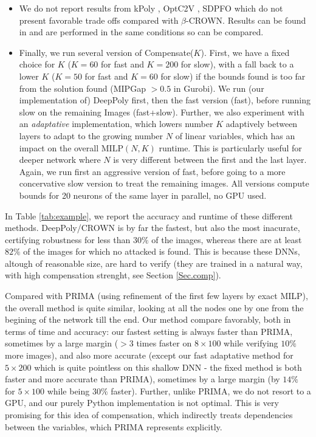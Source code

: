 \documentclass{llncs}
\newcommand{\MILP}{{\textrm{MILP}}}
\begin{document}
\begin{itemize}
	\item We do not report results from kPoly \cite{kpoly}, OptC2V \cite{optC2V}, 
	SDPFO \cite{SDPFI} which do not present favorable trade offs compared with $\beta$-CROWN. Results can be found in \cite{crown} and are performed in the same conditions so can be compared.
	\item Finally, we run several version of Compensate($K$). First, we have a fixed choice for $K$ ($K=60$ for fast and $K=200$ for slow), with a fall back to a lower $K$ ($K=50$ for fast and $K=60$ for slow) if the bounds found is too far from the solution found (MIPGap $>0.5$ in Gurobi). We run (our implementation of) DeepPoly first, then the fast version (fast), before running slow on the remaining Images (fast+slow).	
	Further, we also experiment with an {\em adaptative} implementation, which lowers number $K$ adaptively between layers to adapt to the growing number $N$ of linear variables, which has an impact on the overall $\MILP(N,K)$ runtime. This is particularly useful for deeper network where $N$ is very different between the first and the last layer. Again, we run first an aggressive version of fast, before going to a more concervative slow version to treat the remaining images. All versions compute bounds for 20 neurons of the same layer in parallel, no GPU used.
\end{itemize}


In Table \ref{tab:example}, we report the accuracy and runtime of these different methods.
DeepPoly/CROWN is by far the fastest, but also the most inacurate, certifying robustness for less than $30\%$ of the images, whereas there are at least $82\%$ of the images for which no attacked is found.
This is because these DNNs, altough of reasonable size, are hard to verify (they are trained in a natural way, with high compensation strenght, see Section \ref{Sec.comp}).


Compared with PRIMA (using refinement of the first few layers by exact MILP), the overall method is quite similar, looking at all the nodes one by one from the begining of the network till the end. Our method compare favorably, both in terms of time and accuracy: our fastest setting is always faster than PRIMA, sometimes by a large margin ($>3$ times faster on $8 \times 100$ while verifying $10\%$ more images), and also more accurate (except our fast adaptative method for $5 \times 200$ which is quite pointless on this shallow DNN - the fixed method is both faster and more accurate than PRIMA), sometimes by a large margin (by $14 \%$  for $5 \times 100$ while being $30\%$ faster). Further, unlike PRIMA, we do not resort to a GPU, and our purely Python implementation is not optimal. This is very promising for this idea of compensation, which indirectly treats dependencies between the variables, which PRIMA represents explicitly.
\end{document}
